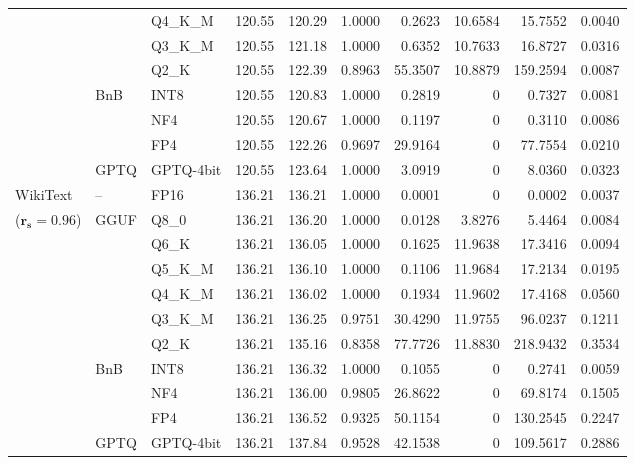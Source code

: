 \begin{longtable}{ll l rrrrrrr}
 &  & Q4\_K\_M & 120.55 & 120.29 & 1.0000 & 0.2623 & 10.6584 & 15.7552 & 0.0040 \\
 &  & Q3\_K\_M & 120.55 & 121.18 & 1.0000 & 0.6352 & 10.7633 & 16.8727 & 0.0316 \\
 &  & Q2\_K & 120.55 & 122.39 & \cellcolor{red!18} 0.8963 & \cellcolor{red!18} 55.3507 & 10.8879 & \cellcolor{red!18} 159.2594 & \cellcolor{red!18} 0.0087 \\
 & BnB & INT8 & 120.55 & 120.83 & 1.0000 & 0.2819 & \cellcolor{cyan!12} $0$ & 0.7327 & 0.0081 \\
 &  & NF4 & 120.55 & 120.67 & 1.0000 & 0.1197 & \cellcolor{cyan!12} $0$ & 0.3110 & 0.0086 \\
 &  & FP4 & 120.55 & 122.26 & 0.9697 & 29.9164 & \cellcolor{cyan!12} $0$ & 77.7554 & 0.0210 \\
 & GPTQ & GPTQ-4bit & 120.55 & 123.64 & 1.0000 & 3.0919 & \cellcolor{cyan!12} $0$ & 8.0360 & 0.0323 \\
\midrule
WikiText & -- & FP16 & 136.21 & 136.21 & 1.0000 & 0.0001 & \cellcolor{cyan!12} $0$ & 0.0002 & 0.0037 \\
{\small ($\mathbf{r_s{=}0.96}$)} & GGUF & Q8\_0 & 136.21 & 136.20 & 1.0000 & 0.0128 & 3.8276 & 5.4464 & 0.0084 \\
 &  & Q6\_K & 136.21 & 136.05 & 1.0000 & 0.1625 & 11.9638 & 17.3416 & 0.0094 \\
 &  & Q5\_K\_M & 136.21 & 136.10 & 1.0000 & 0.1106 & 11.9684 & 17.2134 & 0.0195 \\
 &  & Q4\_K\_M & 136.21 & 136.02 & 1.0000 & 0.1934 & 11.9602 & 17.4168 & 0.0560 \\
 &  & Q3\_K\_M & 136.21 & 136.25 & 0.9751 & 30.4290 & 11.9755 & 96.0237 & 0.1211 \\
 &  & Q2\_K & 136.21 & 135.16 & \cellcolor{red!18} 0.8358 & \cellcolor{red!18} 77.7726 & 11.8830 & \cellcolor{red!18} 218.9432 & \cellcolor{red!18} 0.3534 \\
 & BnB & INT8 & 136.21 & 136.32 & 1.0000 & 0.1055 & \cellcolor{cyan!12} $0$ & 0.2741 & 0.0059 \\
 &  & NF4 & 136.21 & 136.00 & 0.9805 & 26.8622 & \cellcolor{cyan!12} $0$ & 69.8174 & 0.1505 \\
 &  & FP4 & 136.21 & 136.52 & \cellcolor{red!18} 0.9325 & \cellcolor{red!18} 50.1154 & \cellcolor{cyan!12} $0$ & \cellcolor{red!18} 130.2545 & \cellcolor{red!18} 0.2247 \\
 & GPTQ & GPTQ-4bit & 136.21 & 137.84 & 0.9528 & 42.1538 & \cellcolor{cyan!12} $0$ & 109.5617 & 0.2886 \\

\end{longtable}
